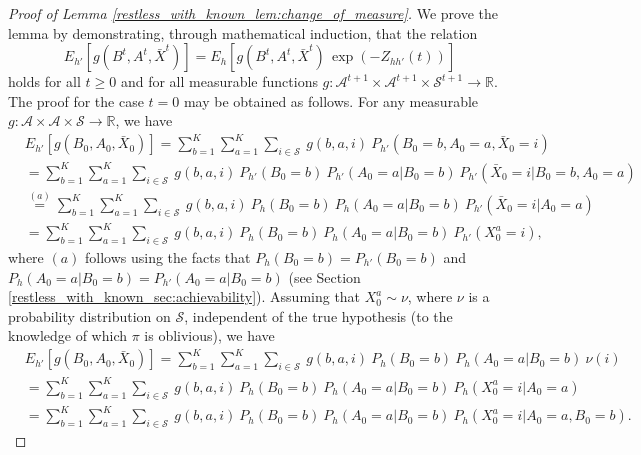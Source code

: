 \begin{proof}[Proof of Lemma \ref{restless_with_known_lem:change_of_measure}]
 We prove the lemma by demonstrating, through mathematical induction, that the relation
 \begin{equation}
 	E_{h'}[g(B^t,A^t,\bar{X}^t)]=E_h[g(B^t,A^t,\bar{X}^t)\,\exp(-Z_{hh'}(t))]\label{restless_with_known_eq:change_of_measure_equiv}
 \end{equation}
 holds for all $t\geq 0$ and for all measurable functions $g:\mathcal{A}^{t+1}\times\mathcal{A}^{t+1}\times\mathcal{S}^{t+1}\to\mathbb{R}$. The proof for the case $t=0$ may be obtained as follows. For any measurable $g:\mathcal{A}\times\mathcal{A}\times\mathcal{S}\to\mathbb{R}$, we have
 \begingroup \allowdisplaybreaks\begin{align}
 	&E_{h'}[g(B_0,A_0,\bar{X}_0)]=\sum\limits_{b=1}^K\sum\limits_{a=1}^{K}\sum\limits_{i\in\mathcal{S}}~g(b,a,i)~P_{h'}(B_0=b, A_0=a,\bar{X}_0=i)\nonumber\\
 	&=\sum\limits_{b=1}^K\sum\limits_{a=1}^{K}\sum\limits_{i\in\mathcal{S}}~g(b,a,i)~P_{h'}(B_0=b)~P_{h'}(A_0=a|B_0=b)~P_{h'}(\bar{X}_0=i|B_0=b,A_0=a)\nonumber\\
 	&\stackrel{(a)}{=}\sum\limits_{b=1}^K\sum\limits_{a=1}^{K}\sum\limits_{i\in\mathcal{S}}~g(b,a,i)~P_h(B_0=b)~P_h(A_0=a|B_0=b)~P_{h'}(\bar{X}_0=i|A_0=a)\nonumber\\
 	&=\sum\limits_{b=1}^K\sum\limits_{a=1}^{K}\sum\limits_{i\in\mathcal{S}}~g(b,a,i)~P_h(B_0=b)~P_h(A_0=a|B_0=b)~P_{h'}(X_0^a=i),\label{restless_with_known_eq:change_of_measure_1}
 \end{align}\endgroup
 where $(a)$ follows using the facts that $P_h(B_0=b)=P_{h'}(B_0=b)$ and $P_h(A_0=a|B_0=b)=P_{h'}(A_0=a|B_0=b)$ (see Section \ref{restless_with_known_sec:achievability}). Assuming that $X_0^a\sim \nu$, where $\nu$ is a probability distribution on $\mathcal{S}$, independent of the true hypothesis (to the knowledge of which $\pi$ is oblivious), we have
 \begingroup \allowdisplaybreaks\begin{align}
 	&E_{h'}[g(B_0,A_0,\bar{X}_0)]=\sum\limits_{b=1}^{K}\sum\limits_{a=1}^{K}\sum\limits_{i\in\mathcal{S}}~g(b,a,i)~P_h(B_0=b)~P_h(A_0=a|B_0=b)~\nu(i)\\
 	&=\sum\limits_{b=1}^{K}\sum\limits_{a=1}^{K}\sum\limits_{i\in\mathcal{S}}~g(b,a,i)~P_h(B_0=b)~P_h(A_0=a|B_0=b)~P_h(X_0^a=i|A_0=a)\\
 	&=\sum\limits_{b=1}^{K}\sum\limits_{a=1}^{K}\sum\limits_{i\in\mathcal{S}}~g(b,a,i)~P_h(B_0=b)~P_h(A_0=a|B_0=b)~P_h(X_0^a=i|A_0=a, B_0=b).\label{restless_with_known_eq:change_of_measure_2}

\end{align}
\end{proof}
